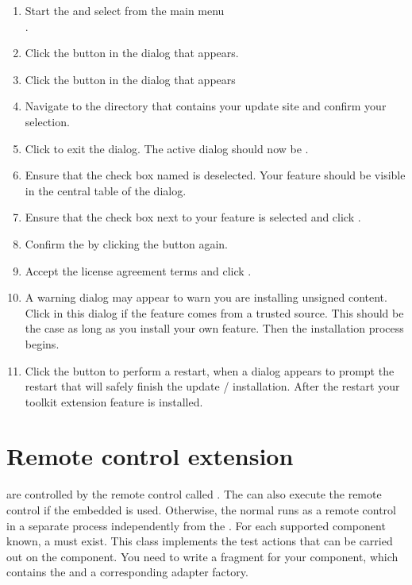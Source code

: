 \begin{enumerate}
\item Start the \ite{}  and select from the main menu\\
.
\item Click the 
button in the  dialog that appears.
\item Click the  button in the  dialog
that appears
\item Navigate to the directory that contains your update site and confirm your
selection.
\item Click  to exit the  dialog.
 The active dialog should now be .
\item Ensure that the check box named  is
deselected. Your feature should be visible in the central table of the dialog.
\item Ensure that the check box next to your feature is selected and click
 .
\item Confirm the  by clicking the 
 button again.
\item Accept the license agreement terms and click .
\item A warning dialog may appear to warn you are installing unsigned content.
 Click  in this dialog if the feature comes from a trusted
 source. This should be the case as long as you install your own feature.
 Then the installation process begins.
\item Click the  button to perform a restart,
 when a dialog appears to prompt the restart that will safely
 finish the update / installation.  After the restart your \ite{} toolkit extension
 feature is installed.
\end{enumerate}

\section{Remote control extension}
\label{remoteControlExtension}

\gdauts{} are controlled by the remote control called \gdagent. The \ite{}
can also execute the remote control if the embedded \gdagent{}  is
used. Otherwise, the normal \gdagent{} runs as a remote control in a
separate process independently from the \ite{}.
For each supported component known, a \gdtesterclass must exist.
This class implements the test actions that can be carried out on the component.
You need to write a fragment for your component, which contains the
\gdtesterclass and a corresponding adapter factory.

